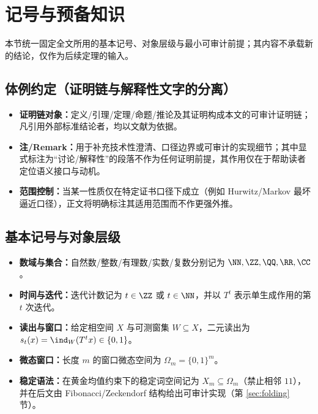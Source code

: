 \section{记号与预备知识}\label{sec:preliminaries}

本节统一固定全文所用的基本记号、对象层级与最小可审计前提；其内容不承载新的结论，仅作为后续定理的输入。

\subsection{体例约定（证明链与解释性文字的分离）}\label{subsec:writing-conventions}
\begin{itemize}
  \item \textbf{证明链对象：}定义/引理/定理/命题/推论及其证明构成本文的可审计证明链；凡引用外部标准结论者，均以文献为依据。
  \item \textbf{注/Remark：}用于补充技术性澄清、口径边界或可审计的实现细节；其中显式标注为“讨论/解释性”的段落不作为任何证明前提，其作用仅在于帮助读者定位语义接口与动机。
  \item \textbf{范围控制：}当某一性质仅在特定证书口径下成立（例如 Hurwitz/Markov 最坏逼近口径），正文将明确标注其适用范围而不作更强外推。
\end{itemize}

\subsection{基本记号与对象层级}
\begin{itemize}
  \item \textbf{数域与集合：}自然数/整数/有理数/实数/复数分别记为
  \(\NN,\ZZ,\QQ,\RR,\CC\)。
  \item \textbf{时间与迭代：}迭代计数记为 \(t\in\ZZ\) 或 \(t\in\NN\)，并以 \(T^t\) 表示单生成作用的第 \(t\) 次迭代。
  \item \textbf{读出与窗口：}给定相空间 \(X\) 与可测窗集 \(W\subseteq X\)，二元读出为
  \(s_t(x)=\ind_W(T^t x)\in\{0,1\}\)。
  \item \textbf{微态窗口：}长度 \(m\) 的窗口微态空间为 \(\Omega_m=\{0,1\}^m\)。
  \item \textbf{稳定语法：}在黄金均值约束下的稳定词空间记为 \(X_m\subseteq\Omega_m\)（禁止相邻 \(11\)），并在后文由 Fibonacci/Zeckendorf 结构给出可审计实现（第 \ref{sec:folding} 节）。
\end{itemize}


